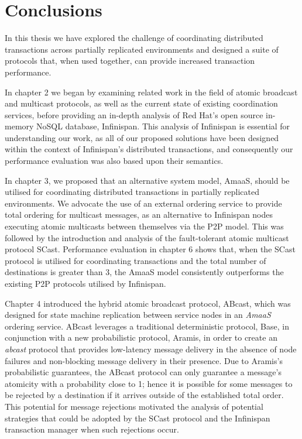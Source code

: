 \chapter{Conclusions}

    \graphicspath{{Chapter7-Conclusions/Figs/Vector/}{Chapter3-Conclusions/Figs/}}

In this thesis we have explored the challenge of coordinating distributed transactions across partially replicated environments and designed a suite of protocols that, when used together, can provide increased transaction performance. 

In chapter 2 we began by examining related work in the field of atomic broadcast and multicast protocols, as well as the current state of existing coordination services, before providing an in-depth analysis of Red Hat's open source in-memory NoSQL database, Infinispan.  This analysis of Infinispan is essential for understanding our work, as all of our proposed solutions have been designed within the context of Infinispan's distributed transactions, and consequently our performance evaluation was also based upon their semantics.

In chapter 3, we proposed that an alternative system model, \textsf{AmaaS}, should be utilised for coordinating distributed transactions in partially replicated environments.  We advocate the use of an external ordering service to provide total ordering for multicast messages, as an alternative to Infinispan nodes executing atomic multicasts between themselves via the P2P model.  This was followed by the introduction and analysis of the fault-tolerant atomic multicast protocol \textsf{SCast}.  Performance evaluation in chapter 6 shows that, when the \textsf{SCast} protocol is utilised for coordinating transactions and the total number of destinations is greater than 3, the \textsf{AmaaS} model consistently outperforms the existing P2P protocols utilised by Infinispan.

Chapter 4 introduced the hybrid atomic broadcast protocol, \textsf{ABcast}, which was designed for state machine replication between service nodes in an \emph{AmaaS} ordering service.  \textsf{ABcast} leverages a traditional deterministic protocol, \textsf{Base}, in conjunction with a new probabilistic protocol, \textsf{Aramis}, in order to create an \emph{abcast} protocol that provides low-latency message delivery in the absence of node failures and non-blocking message delivery in their presence.  Due to \textsf{Aramis}'s probabilistic guarantees, the \textsf{ABcast} protocol can only guarantee a message's atomicity with a probability close to 1; hence it is possible for some messages to be rejected by a destination if it arrives outside of the established total order.  This potential for message rejections motivated the analysis of potential strategies that could be adopted by the \textsf{SCast} protocol and the Infinispan transaction manager when such rejections occur.  

